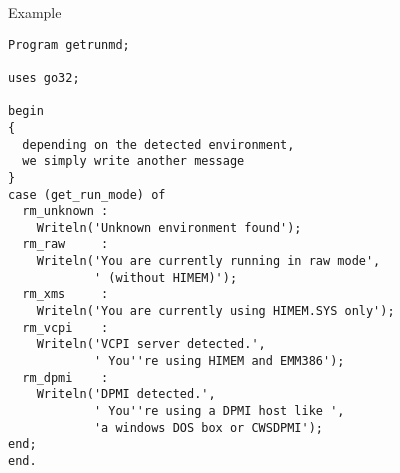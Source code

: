 \begin{FPCList}
\item[Example]
\begin{verbatim}
Program getrunmd;

uses go32;

begin
{
  depending on the detected environment,
  we simply write another message
}
case (get_run_mode) of
  rm_unknown : 
    Writeln('Unknown environment found');
  rm_raw     : 
    Writeln('You are currently running in raw mode',
            ' (without HIMEM)');
  rm_xms     : 
    Writeln('You are currently using HIMEM.SYS only');
  rm_vcpi    : 
    Writeln('VCPI server detected.',
            ' You''re using HIMEM and EMM386');
  rm_dpmi    : 
    Writeln('DPMI detected.',
            ' You''re using a DPMI host like ',
            'a windows DOS box or CWSDPMI');
end;
end.\end{verbatim}
\end{FPCList}
